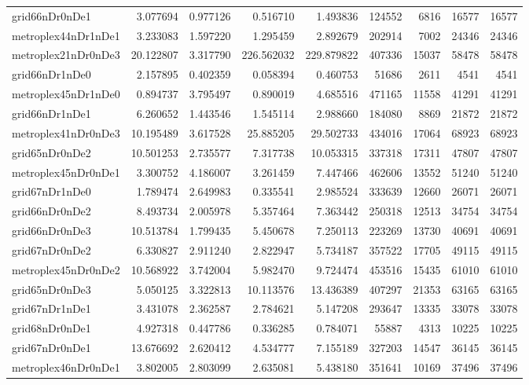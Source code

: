 \begin{longtable}{|l|r|r|r|r|r|r|r|r|}
grid66nDr0nDe1 & 3.077694 & 0.977126 & 0.516710 & 1.493836 & 124552 & 6816 & 16577 & 16577 \\
metroplex44nDr1nDe1 & 3.233083 & 1.597220 & 1.295459 & 2.892679 & 202914 & 7002 & 24346 & 24346 \\
metroplex21nDr0nDe3 & 20.122807 & 3.317790 & 226.562032 & 229.879822 & 407336 & 15037 & 58478 & 58478 \\
grid66nDr1nDe0 & 2.157895 & 0.402359 & 0.058394 & 0.460753 & 51686 & 2611 & 4541 & 4541 \\
metroplex45nDr1nDe0 & 0.894737 & 3.795497 & 0.890019 & 4.685516 & 471165 & 11558 & 41291 & 41291 \\
grid66nDr1nDe1 & 6.260652 & 1.443546 & 1.545114 & 2.988660 & 184080 & 8869 & 21872 & 21872 \\
metroplex41nDr0nDe3 & 10.195489 & 3.617528 & 25.885205 & 29.502733 & 434016 & 17064 & 68923 & 68923 \\
grid65nDr0nDe2 & 10.501253 & 2.735577 & 7.317738 & 10.053315 & 337318 & 17311 & 47807 & 47807 \\
metroplex45nDr0nDe1 & 3.300752 & 4.186007 & 3.261459 & 7.447466 & 462606 & 13552 & 51240 & 51240 \\
grid67nDr1nDe0 & 1.789474 & 2.649983 & 0.335541 & 2.985524 & 333639 & 12660 & 26071 & 26071 \\
grid66nDr0nDe2 & 8.493734 & 2.005978 & 5.357464 & 7.363442 & 250318 & 12513 & 34754 & 34754 \\
grid66nDr0nDe3 & 10.513784 & 1.799435 & 5.450678 & 7.250113 & 223269 & 13730 & 40691 & 40691 \\
grid67nDr0nDe2 & 6.330827 & 2.911240 & 2.822947 & 5.734187 & 357522 & 17705 & 49115 & 49115 \\
metroplex45nDr0nDe2 & 10.568922 & 3.742004 & 5.982470 & 9.724474 & 453516 & 15435 & 61010 & 61010 \\
grid65nDr0nDe3 & 5.050125 & 3.322813 & 10.113576 & 13.436389 & 407297 & 21353 & 63165 & 63165 \\
grid67nDr1nDe1 & 3.431078 & 2.362587 & 2.784621 & 5.147208 & 293647 & 13335 & 33078 & 33078 \\
grid68nDr0nDe1 & 4.927318 & 0.447786 & 0.336285 & 0.784071 & 55887 & 4313 & 10225 & 10225 \\
grid67nDr0nDe1 & 13.676692 & 2.620412 & 4.534777 & 7.155189 & 327203 & 14547 & 36145 & 36145 \\
metroplex46nDr0nDe1 & 3.802005 & 2.803099 & 2.635081 & 5.438180 & 351641 & 10169 & 37496 & 37496 \\

\end{longtable}
